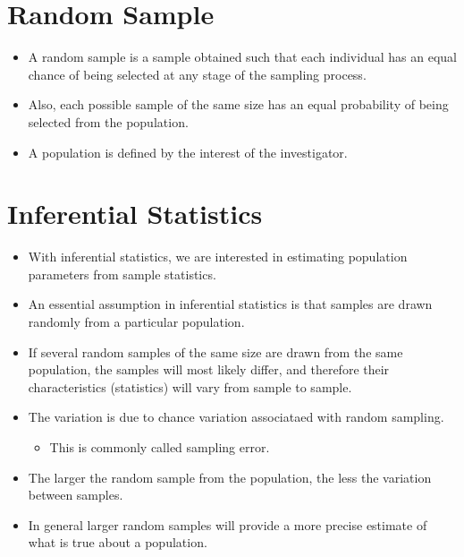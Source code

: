 \documentclass[12pt]{article}
\begin{document}
\section{Random Sample}\label{random-sample}

\begin{itemize}
\itemsep1pt\parskip0pt
\item
  A random sample is a sample obtained such that each individual has an
  equal chance of being selected at any stage of the sampling process.
\item
  Also, each possible sample of the same size has an equal probability
  of being selected from the population.
\item
  A population is defined by the interest of the investigator.
\end{itemize}

\section{Inferential Statistics}\label{inferential-statistics-1}

\begin{itemize}
\itemsep1pt\parskip0pt
\item
  With inferential statistics, we are interested in estimating
  population parameters from sample statistics.
\item
  An essential assumption in inferential statistics is that samples are
  drawn randomly from a particular population.
\item
  If several random samples of the same size are drawn from the same
  population, the samples will most likely differ, and therefore their
  characteristics (statistics) will vary from sample to sample.
\item
  The variation is due to chance variation associataed with random
  sampling.

  \begin{itemize}
  \itemsep1pt\parskip0pt
  \item
    This is commonly called sampling error.
  \end{itemize}
\item
  The larger the random sample from the population, the less the
  variation between samples.
\item
  In general larger random samples will provide a more precise estimate
  of what is true about a population.
\end{itemize}
\end{document}
